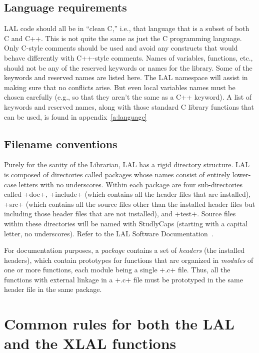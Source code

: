 \documentclass[10pt]{ligodcc}
\makeatletter
\def\verb{\relax\ifmmode\hbox\else\leavevmode\null\fi
  \bgroup
    \color{blue}\small
    \verb@eol@error \let\do\@makeother \dospecials
    \verbatim@font\@noligs
    \@ifstar\@sverb\@verb}
\makeatother
\begin{document}
\subsection{Language requirements}
LAL code should all be in ``clean C,'' i.e., that language that is a
subset of both C and C++.  This is not quite the same as just the C
programming language.  Only C-style comments should be used and avoid
any constructs that would behave differently with C++-style comments.
Names of variables, functions, etc., should not be any of the reserved
keywords or names for the library.  Some of the keywords and reserved
names are listed here.  The LAL namespace will assist in making sure
that no conflicts arise.  But even local variables names must be chosen
carefully (e.g., so that they aren't the same as a C++ keyword).
A list of keywords and reserved names, along with those standard C library
functions that can be used, is found in appendix~\ref{a:language}


\subsection{Filename conventions}

Purely for the sanity of the Librarian, LAL has a rigid directory structure.
LAL is composed of directories called packages whose names consist of entirely
lower-case letters with no underscores.  Within each package are four
sub-directories called \verb+doc+, \verb+include+ (which contains all the
header files that are installed), \verb+src+ (which contains all the source
files other than the installed header files but including those header files
that are not installed), and \verb+test+.  Source files within these
directories will be named with StudlyCaps (starting with a capital letter, no
underscores).  Refer to the LAL Software Documentation~\cite{lsd}.

For documentation purposes, a \emph{package} contains a set of \emph{headers}
(the installed headers), which contain prototypes for functions that are
organized in \emph{modules} of one or more functions, each module being a
single \verb+.c+ file.  Thus, all the functions with external linkage in a
\verb+.c+ file must be prototyped in the same header file in the same package.


\section{Common rules for both the LAL and the XLAL functions}
\end{document}
